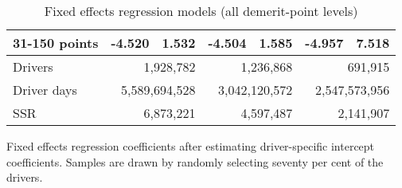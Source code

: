 \begin{table}
\begin{tabular}{l r r r r r r}
31-150 points  & -4.520  &  1.532  & -4.504  &  1.585  & -4.957  &  7.518   \\ 
 

\hline 
 

Drivers 
 & \multicolumn{2}{r}{1,928,782}  & \multicolumn{2}{r}{1,236,868}  & \multicolumn{2}{r}{691,915}   \\ 
 

Driver days 
 & \multicolumn{2}{r}{5,589,694,528}  & \multicolumn{2}{r}{3,042,120,572}  & \multicolumn{2}{r}{2,547,573,956}   \\ 
 

SSR 
 & \multicolumn{2}{r}{6,873,221}  & \multicolumn{2}{r}{4,597,487}  & \multicolumn{2}{r}{2,141,907}   \\ 
 

\hline 
 
\end{tabular} 
\caption{Fixed effects regression models (all demerit-point levels)} 
Fixed effects regression coefficients after estimating driver-specific intercept coefficients. 
Samples are drawn by randomly selecting seventy per cent of the drivers. 
\label{tab:FE_regs_all_pts} 
\end{table} 
 
